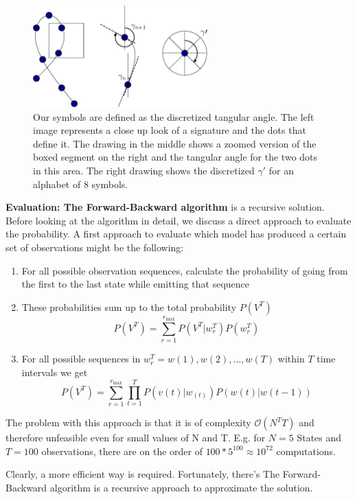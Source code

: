 \documentclass[a4paper, oneside]{csthesis}
\begin{document}
\begin{figure}[tb]
    \begin{center}
        \includegraphics[width=0.6\textwidth]{figures/symbol-creation.eps}
    \end{center}
    \caption{Our symbols are defined as the discretized tangular angle. The left image represents a close up look of a signature and the dots that define it. The drawing in the middle shows a zoomed version of the boxed segment on the right and the tangular angle for the two dots in this area. The right drawing shows the discretized $\gamma\prime$ for an alphabet of 8 symbols.}
    \label{fig:hmm-symbol-creation}
\end{figure}


\textbf{Evaluation: The Forward-Backward algorithm} is a recursive solution. Before looking at the algorithm in detail, we discuss a direct approach to evaluate the probability. A first approach to evaluate which model has produced a certain set of observations might be the following:
\begin{enumerate}
\item For all possible observation sequences, calculate the probability of going from the first to the last state while emitting that sequence
\item These probabilities sum up to the total probability $P(V^T)$
$$P(V^T) = \sum\limits_{r=1}^{r_\text{max}} P(V^T | w_r^T)P(w_r^T)$$
\item For all possible sequences in $w_r^T = w(1), w(2), ..., w(T)$ within $T$ time intervals we get
$$P(V^T) = \sum\limits_{r=1}^{r_\text{max}} \prod\limits_{t=1}^T  P(v(t) | w_(t)) P(w(t)|w(t-1))$$
\end{enumerate}
The problem with this approach is that it is of complexity $\mathcal{O}(N^TT)$ and therefore unfeasible even for small values of N and T. E.g. for $N=5$ States and $T=100$ observations, there are on the order of $100 * 5^100 \approx 10^{72}$ computations.

Clearly, a more efficient way is required. Fortunately, there's The Forward-Backward algorithm is a recursive approach to approximate the solution.
\end{document}
